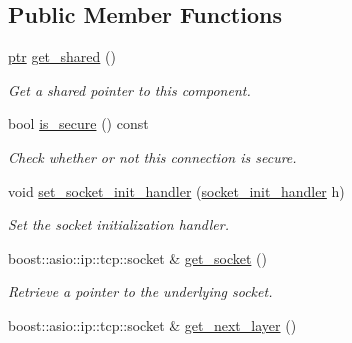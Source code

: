 \subsection*{Public Member Functions}
\begin{DoxyCompactItemize}
\item 
\hyperlink{classwebsocketpp_1_1transport_1_1asio_1_1basic__socket_1_1connection_a1a4fa6887235c53c7ddd13307798b280}{ptr} \hyperlink{classwebsocketpp_1_1transport_1_1asio_1_1basic__socket_1_1connection_ade8aecc68665126f6beb82e74169a96d}{get\+\_\+shared} ()\hypertarget{classwebsocketpp_1_1transport_1_1asio_1_1basic__socket_1_1connection_ade8aecc68665126f6beb82e74169a96d}{}\label{classwebsocketpp_1_1transport_1_1asio_1_1basic__socket_1_1connection_ade8aecc68665126f6beb82e74169a96d}

\begin{DoxyCompactList}\small\item\em Get a shared pointer to this component. \end{DoxyCompactList}\item 
bool \hyperlink{classwebsocketpp_1_1transport_1_1asio_1_1basic__socket_1_1connection_a747da29816758e8aae89ff36542c7c7d}{is\+\_\+secure} () const
\begin{DoxyCompactList}\small\item\em Check whether or not this connection is secure. \end{DoxyCompactList}\item 
void \hyperlink{classwebsocketpp_1_1transport_1_1asio_1_1basic__socket_1_1connection_a2ea605a8c2ed46812057b36b7a0ddf6a}{set\+\_\+socket\+\_\+init\+\_\+handler} (\hyperlink{namespacewebsocketpp_1_1transport_1_1asio_1_1basic__socket_ab555b373b1b4e9af85c677c8c67db3ed}{socket\+\_\+init\+\_\+handler} h)
\begin{DoxyCompactList}\small\item\em Set the socket initialization handler. \end{DoxyCompactList}\item 
boost\+::asio\+::ip\+::tcp\+::socket \& \hyperlink{classwebsocketpp_1_1transport_1_1asio_1_1basic__socket_1_1connection_a6d4c69c55d6a166757da38ae7d58bfde}{get\+\_\+socket} ()
\begin{DoxyCompactList}\small\item\em Retrieve a pointer to the underlying socket. \end{DoxyCompactList}\item 
boost\+::asio\+::ip\+::tcp\+::socket \& \hyperlink{classwebsocketpp_1_1transport_1_1asio_1_1basic__socket_1_1connection_a068f5ae9a9ff87d9b65cc63d4d199b44}{get\+\_\+next\+\_\+layer} ()

\end{DoxyCompactItemize}
